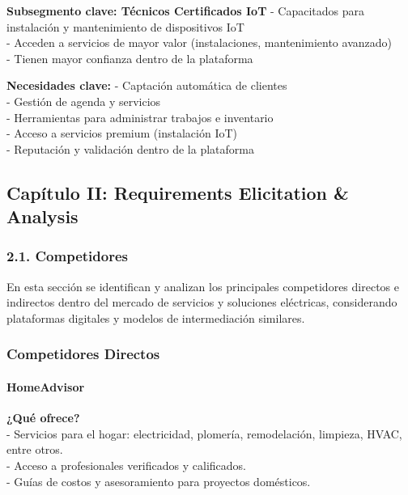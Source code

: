 \textbf{Subsegmento clave: Técnicos Certificados IoT} - Capacitados para
instalación y mantenimiento de dispositivos IoT\\
- Acceden a servicios de mayor valor (instalaciones, mantenimiento
avanzado)\\
- Tienen mayor confianza dentro de la plataforma

\textbf{Necesidades clave:} - Captación automática de clientes\\
- Gestión de agenda y servicios\\
- Herramientas para administrar trabajos e inventario\\
- Acceso a servicios premium (instalación IoT)\\
- Reputación y validación dentro de la plataforma

\newpage

\subsection{Capítulo II: Requirements Elicitation \&
Analysis}\label{report__20-cap2-requirements-analysis.md__capuxedtulo-ii-requirements-elicitation-analysis}

\subsubsection{2.1.
Competidores}\label{report__20-cap2-requirements-analysis.md__competidores}

En esta sección se identifican y analizan los principales competidores
directos e indirectos dentro del mercado de servicios y soluciones
eléctricas, considerando plataformas digitales y modelos de
intermediación similares.

\subsubsection{Competidores
Directos}\label{report__20-cap2-requirements-analysis.md__competidores-directos}

\paragraph{HomeAdvisor}\label{report__20-cap2-requirements-analysis.md__homeadvisor}

\textbf{¿Qué ofrece?}\\
- Servicios para el hogar: electricidad, plomería, remodelación,
limpieza, HVAC, entre otros.\\
- Acceso a profesionales verificados y calificados.\\
- Guías de costos y asesoramiento para proyectos domésticos.

